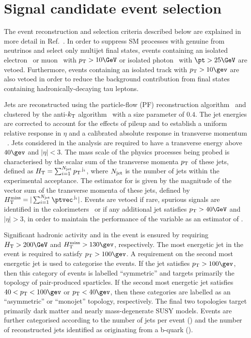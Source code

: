 \section{Signal candidate event selection}
\label{sec:event_selection}

The event reconstruction and selection criteria described below are
explained in more detail in Ref.~\cite{RA1Paper2012}. In order to
suppress SM processes with genuine \ETmiss from neutrinos and select
only multijet final states, events containing an isolated
electron~\cite{PAS-EGM-10-004} or muon~\cite{PAS-MUO-10-004} with $\Pt
> 10\GeV$ or isolated photon~\cite{PAS-EGM-10-006} with $\pt > 25\GeV$
are vetoed. Furthermore, events containing an isolated track with $\Pt
> 10\gev$ are also vetoed in order to reduce the background
contribution from final states containing hadronically-decaying tau
leptons.

Jets are reconstructed using the particle-flow (PF) reconstruction
algorithm~\cite{CMS-PAS-PFT-09-001, CMS-PAS-PFT-10-001} and clustered
by the anti-$k_{\rm T}$ algorithm~\cite{antikt} with a size parameter
of $0.4$. The jet energies are corrected to account for the effects of
pileup and to establish a uniform relative response in $\eta$ and a
calibrated absolute response in transverse momentum
\pt~\cite{2011arXiv1107.4277C}. Jets considered in the analysis are
required to have a transverse energy above $40\gev$ and $|\eta| <
3$. The mass scale of the physics processes being probed is
characterised by the scalar sum of the transverse momenta ${p_{\text T}}$ of
these jets, defined as $H_{\mathrm{T}} = \sum_{i=1}^{N_{\rm jet}}
{p_{\text T}}^{\,\mathrm{j}_i}$, where $N_{\rm jet}$ is the number of jets
within the experimental acceptance. The estimator for \ETmiss is given
by the magnitude of the vector sum of the transverse momenta of these
jets, defined by $\mht = |\sum_{i=1}^{N_\text{jet}}
\ptvec^{\,\mathrm{j}_i}|$. Events are vetoed if rare, spurious signals
are identified in the calorimeters~\cite{1748-0221-5-03-T03014,
  CMS-NOTE-2010-012} or if any additional jet satisfies $\Pt > 40\GeV$
and $|\eta| > 3$, in order to maintain the performance of the variable
\mht as an estimator of \ETmiss.

Significant hadronic activity and \ETmiss in the event is ensured by
requiring $\scalht > 200\GeV$ and $\mht > 130\gev$, respectively. The
most energetic jet in the event is required to satisfy $\Pt >
100\gev$. A requirement on the second most energetic jet is used to
categorise the events. If the jet satisfies $\Pt > 100\gev$, then this
category of events is labelled ``symmetric'' and targets primarily the
topology of pair-produced sparticles. If the second most energetic jet
satisfies $40 < \Pt < 100\gev$ or $\Pt < 40\gev$, then these
categories are labelled as an ``asymmetric'' or ``monojet'' topology,
respectively. The final two topologies target primarily dark matter
and nearly mass-degenerate SUSY models. Events are further categorised
according to the number of jets per event (\njet) and the number of
reconstructed jets identified as originating from a b-quark (\nb).


